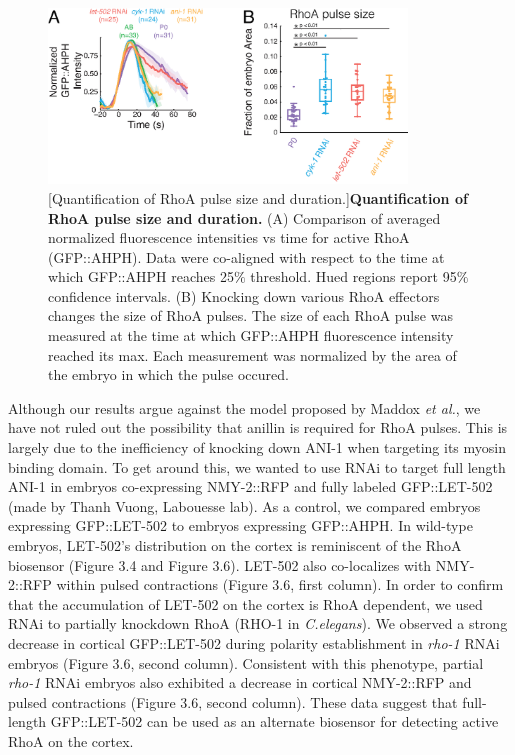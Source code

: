 \documentclass{ucetd}
\begin{document}
\begin{figure}[!htbp]
\centering
\includegraphics[width=0.85\textwidth]{Figure3-5}
[Quantification of RhoA pulse size and duration.]{\textbf{Quantification of RhoA pulse size and duration.} (A) Comparison of averaged normalized fluorescence intensities vs time for active RhoA (GFP::AHPH).  Data were co-aligned with respect to the time at which GFP::AHPH reaches 25$\%$ threshold. Hued regions report 95$\%$ confidence intervals. (B) Knocking down various RhoA effectors changes the size of RhoA pulses.  The size of each RhoA pulse was measured at the time at which GFP::AHPH fluorescence intensity reached its max.  Each measurement was normalized by the area of the embryo in which the pulse occured. }
\end{figure}


Although our results argue against the model proposed by Maddox \textit{et al.}, we have not ruled out the possibility that anillin is required for RhoA pulses.  This is largely due to the inefficiency of knocking down ANI-1 when targeting its myosin binding domain.  To get around this, we wanted to use RNAi to target full length ANI-1 in embryos co-expressing NMY-2::RFP and  fully labeled GFP::LET-502 (made by Thanh Vuong, Labouesse lab).  As a control, we compared embryos expressing GFP::LET-502 to embryos expressing GFP::AHPH.  In wild-type embryos, LET-502's distribution on the cortex is reminiscent of the RhoA biosensor (Figure 3.4 and Figure 3.6).  LET-502 also co-localizes with NMY-2::RFP within pulsed contractions (Figure 3.6, first column).   In order to confirm that the accumulation of LET-502 on the cortex is RhoA dependent, we used RNAi to partially knockdown RhoA (RHO-1 in \textit{C.elegans}).  We observed a strong decrease in cortical GFP::LET-502 during polarity establishment in \textit{rho-1} RNAi embryos (Figure 3.6, second column).  Consistent with this phenotype, partial \textit{rho-1} RNAi embryos also exhibited a decrease in cortical NMY-2::RFP and pulsed contractions (Figure 3.6, second column).  These data suggest that full-length GFP::LET-502 can be used as an alternate biosensor for detecting active RhoA on the cortex.
\end{document}
